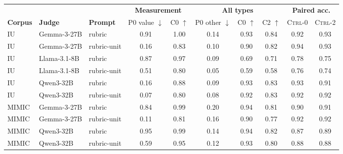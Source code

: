 \begin{tabular}{lllccccccc}
\toprule
 & & & \multicolumn{2}{c}{\textbf{Measurement}} & \multicolumn{3}{c}{\textbf{All types}} & \multicolumn{2}{c}{\textbf{Paired acc.}} \\
\cmidrule(lr){4-5}\cmidrule(lr){6-8}\cmidrule(lr){9-10}
\textbf{Corpus} & \textbf{Judge} & \textbf{Prompt} & P0 value $\downarrow$ & C0 $\uparrow$ & P0 other $\downarrow$ & C0 $\uparrow$ & C2 $\uparrow$ & \textsc{Ctrl-0} & \textsc{Ctrl-2} \\
\midrule
IU & Gemma-3-27B & rubric & 0.91 & 1.00 & 0.14 & 0.93 & 0.84 & 0.92 & 0.93 \\
IU & Gemma-3-27B & rubric-unit & 0.16 & 0.83 & 0.10 & 0.90 & 0.82 & 0.94 & 0.93 \\
IU & Llama-3.1-8B & rubric & 0.87 & 0.97 & 0.09 & 0.69 & 0.71 & 0.78 & 0.75 \\
IU & Llama-3.1-8B & rubric-unit & 0.51 & 0.80 & 0.05 & 0.59 & 0.58 & 0.76 & 0.74 \\
IU & Qwen3-32B & rubric & 0.16 & 0.88 & 0.09 & 0.93 & 0.83 & 0.93 & 0.91 \\
IU & Qwen3-32B & rubric-unit & 0.07 & 0.80 & 0.08 & 0.92 & 0.83 & 0.92 & 0.92 \\
MIMIC & Gemma-3-27B & rubric & 0.84 & 0.99 & 0.20 & 0.94 & 0.81 & 0.90 & 0.91 \\
MIMIC & Gemma-3-27B & rubric-unit & 0.11 & 0.81 & 0.16 & 0.90 & 0.77 & 0.92 & 0.92 \\
MIMIC & Qwen3-32B & rubric & 0.95 & 0.99 & 0.14 & 0.94 & 0.82 & 0.87 & 0.89 \\
MIMIC & Qwen3-32B & rubric-unit & 0.59 & 0.95 & 0.12 & 0.93 & 0.80 & 0.88 & 0.88 \\
\bottomrule
\end{tabular}